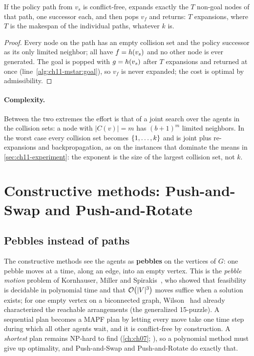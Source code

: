 \begin{corollary}
\label{thm:ch11-linear}
If the policy path from $v_s$ is conflict-free, \mstar expands exactly the
$T$ non-goal nodes of that path, one successor each, and then pops $v_f$ and
returns: $T$ expansions, where $T$ is the makespan of the individual paths,
whatever $k$ is.
\end{corollary}
\begin{proof}
Every node on the path has an empty collision set and the policy successor
as its only limited neighbor; all have $f = h(v_s)$ and no other
node is ever generated. The goal is popped with $g = h(v_s)$ after
$T$ expansions and returned at once
(line~\ref{alg:ch11-mstar:goal}), so $v_f$ is never expanded; the cost is
optimal by admissibility.
\end{proof}

\paragraph{Complexity.} Between the two extremes the effort is that of a
joint search over the agents in the collision sets: a node with $|C(v)| = m$
has $(b+1)^m$ limited neighbors. In the worst case every collision set
becomes $\left\{ 1, \dots, k \right\}$ and \mstar is joint \astar plus re-expansions
and backpropagation, as on the instances that dominate the means in
\cref{sec:ch11-experiment}: the exponent is the size of the largest
collision set, not $k$.

\section{Constructive methods: Push-and-Swap and Push-and-Rotate}
\label{sec:ch11-constructive}

\subsection{Pebbles instead of paths}

The constructive methods see the agents as \textbf{pebbles}
on the vertices of $G$: one pebble moves at a time, along an edge, into an
empty vertex. This is the \emph{pebble motion} problem of Kornhauser, Miller
and Spirakis~\cite{kornhauser1984pebble}, who showed that feasibility is
decidable in polynomial time and that $\mathcal{O}\!\left(|V|^3\right)$ moves suffice when a
solution exists; for one empty vertex on a biconnected graph,
Wilson~\cite{wilson1974graph} had already characterized the reachable
arrangements (the generalized 15-puzzle). A sequential plan becomes a MAPF
plan by letting every move take one time step during which all other
agents wait, and it is conflict-free by construction. A \emph{shortest}
plan remains NP-hard to find (\cref{ch:ch07};
\cite{surynek2010optimization,yu2013structure}), so a polynomial method must
give up optimality, and Push-and-Swap and Push-and-Rotate do exactly that.

